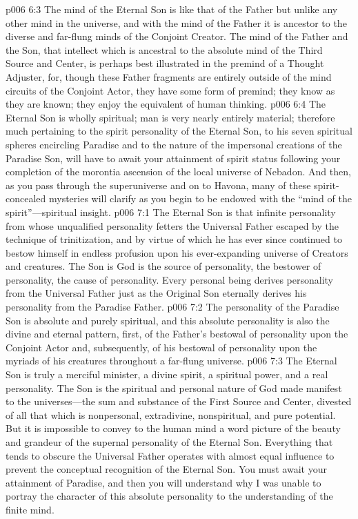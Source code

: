 \vs p006 6:3 The mind of the Eternal Son is like that of the Father but unlike any other mind in the universe, and with the mind of the Father it is ancestor to the diverse and far\hyp{}flung minds of the Conjoint Creator. The mind of the Father and the Son, that intellect which is ancestral to the absolute mind of the Third Source and Center, is perhaps best illustrated in the premind of a Thought Adjuster, for, though these Father fragments are entirely outside of the mind circuits of the Conjoint Actor, they have some form of premind; they know as they are known; they enjoy the equivalent of human thinking.
\vs p006 6:4 The Eternal Son is wholly spiritual; man is very nearly entirely material; therefore much pertaining to the spirit personality of the Eternal Son, to his seven spiritual spheres encircling Paradise and to the nature of the impersonal creations of the Paradise Son, will have to await your attainment of spirit status following your completion of the morontia ascension of the local universe of Nebadon. And then, as you pass through the superuniverse and on to Havona, many of these spirit\hyp{}concealed mysteries will clarify as you begin to be endowed with the “mind of the spirit”---spiritual insight.
\vs p006 7:1 The Eternal Son is that infinite personality from whose unqualified personality fetters the Universal Father escaped by the technique of trinitization, and by virtue of which he has ever since continued to bestow himself in endless profusion upon his ever\hyp{}expanding universe of Creators and creatures. The Son is  God is the source of personality, the bestower of personality, the cause of personality. Every personal being derives personality from the Universal Father just as the Original Son eternally derives his personality from the Paradise Father.\plusone
\vs p006 7:2 The personality of the Paradise Son is absolute and purely spiritual, and this absolute personality is also the divine and eternal pattern, first, of the Father’s bestowal of personality upon the Conjoint Actor and, subsequently, of his bestowal of personality upon the myriads of his creatures throughout a far\hyp{}flung universe.
\vs p006 7:3 The Eternal Son is truly a merciful minister, a divine spirit, a spiritual power, and a real personality. The Son is the spiritual and personal nature of God made manifest to the universes---the sum and substance of the First Source and Center, divested of all that which is nonpersonal, extradivine, nonspiritual, and pure potential. But it is impossible to convey to the human mind a word picture of the beauty and grandeur of the supernal personality of the Eternal Son. Everything that tends to obscure the Universal Father operates with almost equal influence to prevent the conceptual recognition of the Eternal Son. You must await your attainment of Paradise, and then you will understand why I was unable to portray the character of this absolute personality to the understanding of the finite mind.
